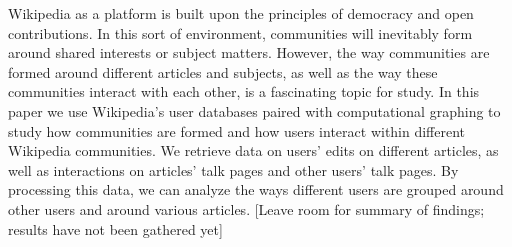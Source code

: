 
Wikipedia as a platform is built upon the principles of democracy and open contributions. In this sort of environment, communities will inevitably form around shared interests or subject matters. However, the way communities are formed around different articles and subjects, as well as the way these communities interact with each other, is a fascinating topic for study. In this paper we use Wikipedia's user databases paired with computational graphing to study how communities are formed and how users interact within different Wikipedia communities. We retrieve data on users' edits on different articles, as well as interactions on articles' talk pages and other users' talk pages. By processing this data, we can analyze the ways different users are grouped around other users and around various articles. [Leave room for summary of findings; results have not been gathered yet]
